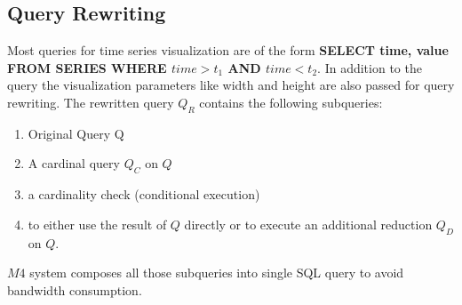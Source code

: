 \subsection{Query Rewriting}
Most queries for time series visualization are of the form \textbf{SELECT time, value FROM 
SERIES WHERE $time > t_1$ AND $time <t_2$}. In addition to the query the visualization parameters like width and height are also passed for query rewriting. 
The rewritten query $Q_R$ contains the following subqueries:
\begin{enumerate}
	\item Original Query Q
	\item A cardinal query $Q_C$ on $Q$
	\item a cardinality check (conditional execution)
	\item to either use the result of $Q$ directly or to execute an additional reduction $Q_D$ on $Q$.
\end{enumerate}
$M4$ system composes all those subqueries into single SQL query to avoid bandwidth consumption.